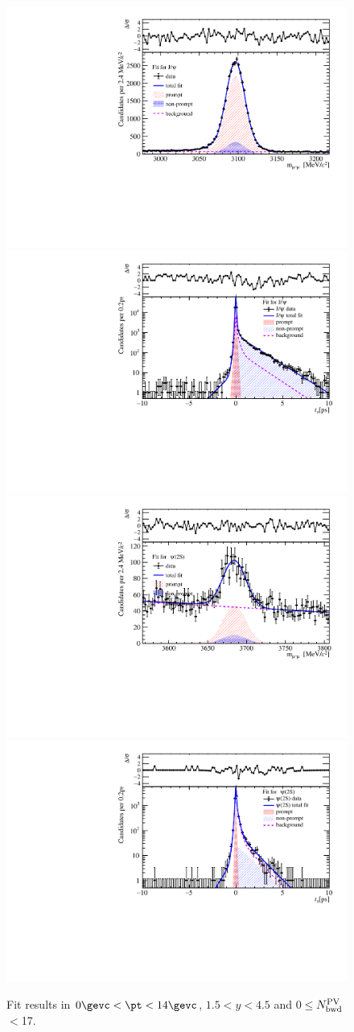 \begin{figure}[H]
\begin{center}
\includegraphics[width=0.45\linewidth]{pdf/pPb/BWorkdir/TwoDimFit/ProjMass/Jpsi_n1y1pt1.pdf}
\includegraphics[width=0.45\linewidth]{pdf/pPb/BWorkdir/TwoDimFit/ProjTz/Jpsi_n1y1pt1.pdf}
\vspace*{-0.5cm}
\includegraphics[width=0.45\linewidth]{pdf/pPb/BWorkdir/TwoDimFit/ProjMass/Psi2S_n1y1pt1.pdf}
\includegraphics[width=0.45\linewidth]{pdf/pPb/BWorkdir/TwoDimFit/ProjTz/Psi2S_n1y1pt1.pdf}
\vspace*{-0.5cm}
\end{center}
\caption{Fit results in $0\gevc<\pt<14\gevc$, $1.5<y<4.5$ and 0$\leq$$N^{\rm PV}_{\rm bwd}$$<$17.}
\end{figure}
